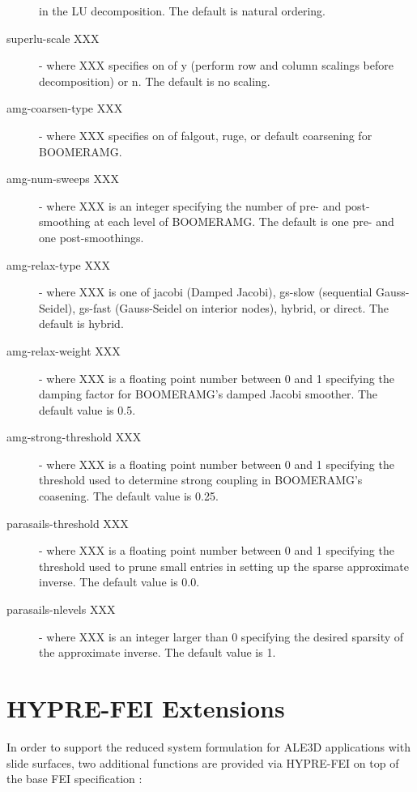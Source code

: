 \begin{description}
                       in the LU decomposition.  The default is natural ordering.
\item[superlu-scale XXX] - where XXX specifies on of {\sf y} (perform row
                       and column scalings before decomposition) or {\sf n}.
                       The default is no scaling.
\item[amg-coarsen-type XXX] - where XXX specifies on of {\sf falgout},
                       {\sf ruge}, or {\sf default} coarsening for BOOMERAMG.
\item[amg-num-sweeps XXX] - where XXX is an integer specifying the number of
                       pre- and post-smoothing at each level of BOOMERAMG.
                       The default is one pre- and one post-smoothings.
\item[amg-relax-type XXX] - where XXX is one of {\sf jacobi} (Damped Jacobi),
                       {\sf gs-slow} (sequential Gauss-Seidel), {\sf gs-fast}
                       (Gauss-Seidel on interior nodes), {\sf hybrid},
                       or {\sf direct}. The default is {\sf hybrid}.
\item[amg-relax-weight XXX] - where XXX is a floating point number between 0 and 1
                       specifying the damping factor for BOOMERAMG's damped
                       Jacobi smoother.  The default value is 0.5.
\item[amg-strong-threshold XXX] - where XXX is a floating point number between 0 
                       and 1 specifying the threshold used to determine
                       strong coupling in BOOMERAMG's coasening.  The default 
                       value is 0.25.
\item[parasails-threshold XXX] - where XXX is a floating point number between 0 
                       and 1 specifying the threshold used to prune small entries
                       in setting up the sparse approximate inverse.  The default
                       value is 0.0.
\item[parasails-nlevels XXX] - where XXX is an integer larger than 0 specifying 
                       the desired sparsity of the approximate inverse.  The
                       default value is 1.
\end{description}


\section{HYPRE-FEI Extensions}

In order to support the reduced system formulation for ALE3D applications
with slide surfaces, two additional functions are provided via HYPRE-FEI
on top of the base FEI specification :

